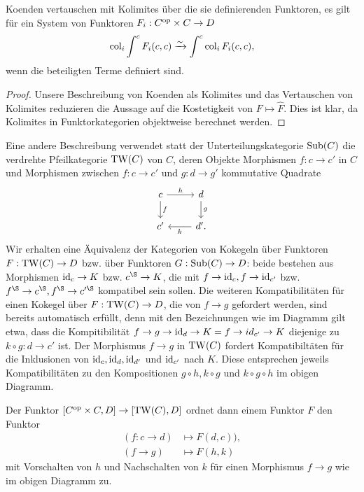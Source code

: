 \begin{kor} \label{coend-cocont}
  Koenden vertauschen mit Kolimites über die sie definierenden
  Funktoren, es gilt für ein System von Funktoren $F_i: C^\mathrm{op} \times C
  \to D$
  \[ \operatorname{col}_i \int^c F_i(c, c) \xrightarrow[]{\sim} \int^c \operatorname{col}_i F_i(c, c), \]
  wenn die beteiligten Terme definiert sind.
\end{kor}
\begin{proof}
  Unsere Beschreibung von Koenden als Kolimites und das Vertauschen
  von Kolimites reduzieren die Aussage auf die Kostetigkeit von $F
  \mapsto \hat{F}$. Dies ist klar, da Kolimites in Funktorkategorien
  objektweise berechnet werden.
\end{proof}
\begin{bem}
  Eine andere Beschreibung verwendet statt der Unterteilungskategorie
  $\operatorname{Sub}(C)$ die verdrehte Pfeilkategorie $\operatorname{TW}(C)$ von $C$, deren
  Objekte Morphismen $f: c \to c'$ in $C$ und Morphismen zwischen $f:
  c \to c'$ und $g: d \to g'$ kommutative Quadrate
  \[ \begin{tikzcd}
    c \arrow{d}{f} \arrow{r}{h} & d \arrow{d}{g} \\
    c' & \arrow{l}{k} d'.
  \end{tikzcd} \]
  Wir erhalten eine Äquivalenz der Kategorien von Kokegeln über
  Funktoren $F: \operatorname{TW}(C) \to D$ bzw. über Funktoren $G: \operatorname{Sub}(C) \to D$:
  beide bestehen aus Morphismen $\operatorname{id}_c \to K$ bzw. $c^\S \to K$, die
  mit $f \to \operatorname{id}_c, f \to \operatorname{id}_{c'}$ bzw. $f^\S \to c^\S, f^\S \to
  c'^\S$ kompatibel sein sollen. Die weiteren Kompatibilitäten für
  einen Kokegel über $F: \operatorname{TW}(C) \to D$, die von $f \to g$ gefordert
  werden, sind bereits automatisch erfüllt, denn mit den Bezeichnungen
  wie im Diagramm gilt etwa, dass die Kompitibilität $f \to g \to
  \operatorname{id}_d \to K = f \to id_{c'} \to K$ diejenige zu $k \circ g: d \to
  c'$ ist. Der Morphismus $f \to g$ in $\operatorname{TW}(C)$ fordert
  Kompatibiltäten für die Inklusionen von $\operatorname{id}_c, \operatorname{id}_d, \operatorname{id}_{d'}$ und
  $\operatorname{id}_{c'}$ nach $K$. Diese entsprechen jeweils Kompatibilitäten zu
  den Kompositionen $g \circ h, k \circ g$ und $k \circ g \circ h$ im
  obigen Diagramm.

  Der Funktor $[C^\mathrm{op} \times C, D] \to [\operatorname{TW}(C), D]$ ordnet dann einem
  Funktor $F$ den Funktor
  \begin{align*}
    (f: c \to d) &\mapsto F(d, c)), \\
    (f \to g) &\mapsto F(h, k)
  \end{align*}
  mit Vorschalten von $h$ und Nachschalten von $k$ für einen
  Morphismus $f \to g$ wie im obigen Diagramm zu.
\end{bem}

